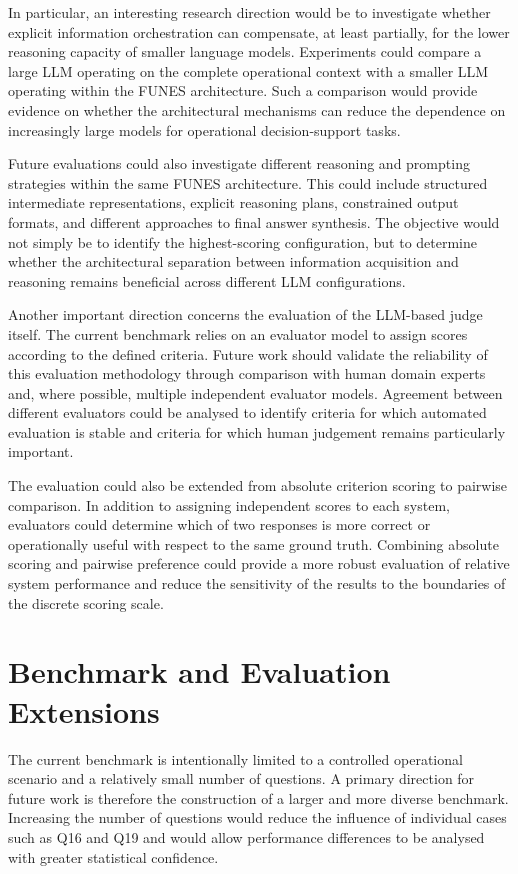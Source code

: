 In particular, an interesting research direction would be to investigate whether explicit information orchestration can compensate, at least partially, for the lower reasoning capacity of smaller language models. Experiments could compare a large LLM operating on the complete operational context with a smaller LLM operating within the FUNES architecture. Such a comparison would provide evidence on whether the architectural mechanisms can reduce the dependence on increasingly large models for operational decision-support tasks.

Future evaluations could also investigate different reasoning and prompting strategies within the same FUNES architecture. This could include structured intermediate representations, explicit reasoning plans, constrained output formats, and different approaches to final answer synthesis. The objective would not simply be to identify the highest-scoring configuration, but to determine whether the architectural separation between information acquisition and reasoning remains beneficial across different LLM configurations.

Another important direction concerns the evaluation of the LLM-based judge itself. The current benchmark relies on an evaluator model to assign scores according to the defined criteria. Future work should validate the reliability of this evaluation methodology through comparison with human domain experts and, where possible, multiple independent evaluator models. Agreement between different evaluators could be analysed to identify criteria for which automated evaluation is stable and criteria for which human judgement remains particularly important.

The evaluation could also be extended from absolute criterion scoring to pairwise comparison. In addition to assigning independent scores to each system, evaluators could determine which of two responses is more correct or operationally useful with respect to the same ground truth. Combining absolute scoring and pairwise preference could provide a more robust evaluation of relative system performance and reduce the sensitivity of the results to the boundaries of the discrete scoring scale.

\section{Benchmark and Evaluation Extensions}

The current benchmark is intentionally limited to a controlled operational scenario and a relatively small number of questions. A primary direction for future work is therefore the construction of a larger and more diverse benchmark. Increasing the number of questions would reduce the influence of individual cases such as Q16 and Q19 and would allow performance differences to be analysed with greater statistical confidence.

